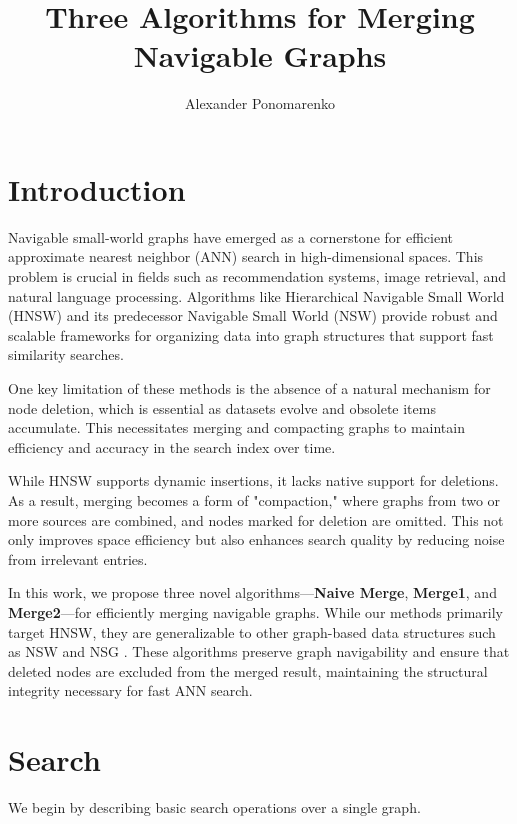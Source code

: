 \documentclass{article}
\title{Three Algorithms for Merging Navigable Graphs}
\author[1]{Alexander Ponomarenko}
\date{}
\affil[1]{HSE Univerity}
\begin{document}
\maketitle

\section{Introduction}
Navigable small-world graphs have emerged as a cornerstone for efficient approximate nearest neighbor (ANN) search in high-dimensional spaces. This problem is crucial in fields such as recommendation systems, image retrieval, and natural language processing. Algorithms like Hierarchical Navigable Small World (HNSW) \cite{hnsw} and its predecessor Navigable Small World (NSW) \cite{nsw2011,nsw2012,nsw2014} provide robust and scalable frameworks for organizing data into graph structures that support fast similarity searches.

One key limitation of these methods is the absence of a natural mechanism for node deletion, which is essential as datasets evolve and obsolete items accumulate. This necessitates merging and compacting graphs to maintain efficiency and accuracy in the search index over time.

While HNSW supports dynamic insertions, it lacks native support for deletions. As a result, merging becomes a form of "compaction," where graphs from two or more sources are combined, and nodes marked for deletion are omitted. This not only improves space efficiency but also enhances search quality by reducing noise from irrelevant entries.

In this work, we propose three novel algorithms—\textbf{Naive Merge}, \textbf{Merge1}, and \textbf{Merge2}—for efficiently merging navigable graphs. While our methods primarily target HNSW, they are generalizable to other graph-based data structures such as NSW \cite{nsw2011} and NSG \cite{NSG}. These algorithms preserve graph navigability and ensure that deleted nodes are excluded from the merged result, maintaining the structural integrity necessary for fast ANN search.

\section{Search}

We begin by describing basic search operations over a single graph.
\end{document}
